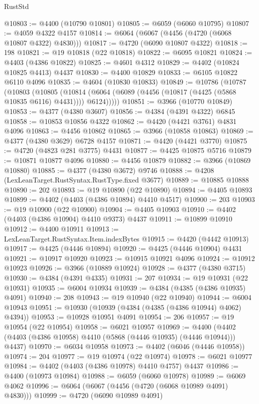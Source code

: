\begin{lexlean}{RustStd}
\begin{coremodule}
@10803 := @4400 (@10790 @10801)
@10805 := @6059 (@6060 @10795)
@10807 := @4059 @4322 @4157
@10814 := @6064 (@6067 (@4456 (@4720 (@6068 @10807 @4322) @4830)))
@10817 := @4720 (@6090 @10807 @4322)
@10818 := 198
@10821 := @19 @10818 (@22 @10818)
@10822 := @6095 @10821
@10824 := @4403 (@4386 @10822)
@10825 := @4601 @4312
@10829 := @4402 (@10824 @10825 @4413) @4437
@10830 := @4400 @10829
@10833 := @6105 @10822 @6110 @4096
@10835 := @4604 (@10830 @10833)
@10849 := @10786
    (@10787
      (@10803
        (@10805
          (@10814 (@6064 (@6089 (@4456 (@10817 (@4425 (@5868 @10835 @6116) @4431)))) @6124)))))
@10851 := @3966 (@10770 @10849)
@10853 := @4377 (@4380 @3607)
@10856 := @4384 (@4391 @4322) @6845
@10858 := @10853 @10856 @4322
@10862 := @4420 (@4421 @3761) @4831 @4096
@10863 := @4456 @10862
@10865 := @3966 (@10858 @10863)
@10869 := @4377 (@4380 @3629) @6728 @4157
@10871 := @4420 (@4421 @3770)
@10875 := @4720 (@4823 @281 @3775) @4431
@10877 := @4425 @10875 @5716
@10879 := @10871 @10877 @4096
@10880 := @4456 @10879
@10882 := @3966 (@10869 @10880)
@10885 := @4377 (@4380 @3672) @9746
@10888 := @4208 (LexLeanTarget.RustSyntax.RustType.fixed @3677)
@10889 := @10885 @10888
@10890 := 202
@10893 := @19 @10890 (@22 @10890)
@10894 := @4405 @10893
@10899 := @4402 (@4403 (@4386 @10894) @4410 @4517)
@10900 := 203
@10903 := @19 @10900 (@22 @10900)
@10904 := @4405 @10903
@10910 := @4402 (@4403 (@4386 @10904) @4410 @9373) @4437
@10911 := @10899 @10910
@10912 := @4400 @10911
@10913 := LexLeanTarget.RustSyntax.Item.indexBytes
@10915 := @4420 (@4442 @10913)
@10917 := @4425 (@4446 @10894)
@10920 := @4425 (@4446 @10904) @4431
@10921 := @10917 @10920
@10923 := @10915 @10921 @4096
@10924 := @10912 @10923
@10926 := @3966 (@10889 @10924)
@10928 := @4377 (@4380 @3715)
@10930 := @4384 (@4391 @4335)
@10931 := 207
@10934 := @19 @10931 (@22 @10931)
@10935 := @6004 @10934
@10939 := @4384 (@4385 (@4386 @10935) @4091)
@10940 := 208
@10943 := @19 @10940 (@22 @10940)
@10944 := @6004 @10943
@10951 := @10930 (@10939 (@4384 (@4385 (@4386 @10944) @4062) @4394))
@10953 := @10928 @10951 @4091
@10954 := 206
@10957 := @19 @10954 (@22 @10954)
@10958 := @6021 @10957
@10969 := @4400 (@4402 (@4403 (@4386 @10958) @4410 (@5868 (@4446 @10935) (@4446 @10944))) @4437)
@10970 := @6034 @10958
@10973 := @4402 (@6046 (@4446 @10958))
@10974 := 204
@10977 := @19 @10974 (@22 @10974)
@10978 := @6021 @10977
@10984 := @4402 (@4403 (@4386 @10978) @4410 @4757) @4437
@10986 := @4400 (@10973 @10984)
@10988 := @6059 (@6060 @10978)
@10989 := @6069 @4062
@10996 := @6064 (@6067 (@4456 (@4720 (@6068 @10989 @4091) @4830)))
@10999 := @4720 (@6090 @10989 @4091)

\end{coremodule}
\end{lexlean}
